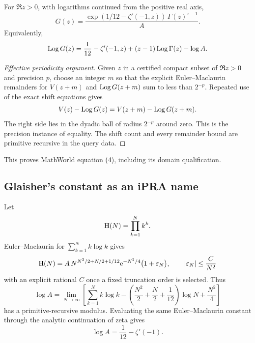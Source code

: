 \begin{theorem}\label{thm:vardi}
For \(\Re z>0\), with logarithms continued from the positive real axis,
\begin{equation}\label{eq:vardi}
 G(z)=\frac{
 \exp(1/12-\zeta'(-1,z))\,\Gamma(z)^{z-1}}{A}.
\end{equation}
Equivalently,
\[
 \operatorname{Log} G(z)=\frac1{12}-\zeta'(-1,z)
 +(z-1)\operatorname{Log}\Gamma(z)-\log A.
\]
\end{theorem}

\begin{proof}[Effective periodicity argument]
Given \(z\) in a certified compact subset of \(\Re z>0\) and precision \(p\),
choose an integer \(m\) so that the explicit Euler--Maclaurin remainders for
\(V(z+m)\) and \(\operatorname{Log} G(z+m)\) sum to less than \(2^{-p}\).  Repeated use of
the exact shift equations gives
\[
 V(z)-\operatorname{Log} G(z)=V(z+m)-\operatorname{Log} G(z+m).
\]
The right side lies in the dyadic ball of radius \(2^{-p}\) around zero.  This
is the precision instance of equality.  The shift count and every remainder
bound are primitive recursive in the query data.
\end{proof}

This proves MathWorld equation (4), including its domain qualification.

\subsection{Glaisher's constant as an iPRA name}

Let
\[
 \operatorname{H}(N)=\prod_{k=1}^{N}k^k.
\]
Euler--Maclaurin for \(\sum_{k=1}^N k\log k\) gives
\begin{equation}\label{eq:hyper-asymp}
 \operatorname{H}(N)=A\,
 N^{N^2/2+N/2+1/12}\mathrm e^{-N^2/4}
 \bigl(1+\varepsilon_N\bigr),
 \qquad |\varepsilon_N|\le \frac{C}{N^2}
\end{equation}
with an explicit rational \(C\) once a fixed truncation order is selected.
Thus
\begin{equation}\label{eq:A-limit}
 \log A=\lim_{N\to\infty}
 \left[
 \sum_{k=1}^{N}k\log k
 -\left(\frac{N^2}{2}+\frac N2+\frac1{12}\right)\log N
 +\frac{N^2}{4}
 \right]
\end{equation}
has a primitive-recursive modulus.  Evaluating the same Euler--Maclaurin
constant through the analytic continuation of zeta gives
\begin{equation}\label{eq:A-zeta-again}
 \log A=\frac1{12}-\zeta'(-1).
\end{equation}

